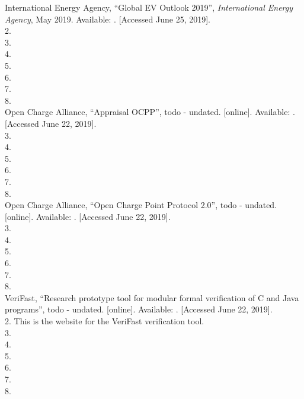 \documentclass[12pt,openany,a4paper]{book}
\begin{document}
\begin{thebibliography}{99}


 International Energy Agency, ``Global EV Outlook 2019'', \textit{International Energy Agency}, May 2019. Available: \href{https://webstore.iea.org/global-ev-outlook-2019}{}. [Accessed June 25, 2019]. \\
2. \\
3. \\
4. \\
5.  \\
6. \\
7. \\
8. \\



 Open Charge Alliance, ``Appraisal OCPP'',  todo - undated. [online]. Available: \href{https://www.openchargealliance.org/about-us/appraisal-ocpp/}{}. [Accessed June 22, 2019]. \\
3. \\
4. \\
5. \\
6. \\
7. \\
8. \\

 Open Charge Alliance, ``Open Charge Point Protocol 2.0'', todo - undated. [online]. Available: \href{https://www.openchargealliance.org/protocols/ocpp-20/}{}. [Accessed June 22, 2019]. \\
3. \\
4. \\
5. \\
6. \\
7. \\
8. \\



 VeriFast, ``Research prototype tool for modular formal verification of C and Java programs'', todo - undated. [online]. Available: \href{https://github.com/verifast/verifast/}{}. [Accessed June 22, 2019]. \\
2. This is the website for the VeriFast verification tool.\\
3. \\
4. \\
5. \\
6. \\
7. \\
8. \\




\end{thebibliography}
\end{document}
